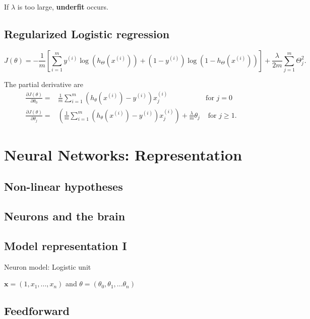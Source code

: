 \documentclass[a4paper,titlepage] {scrartcl}
\begin{document}
If $\lambda$ is too large, \textbf{underfit} occurs.

\subsection{Regularized Logistic regression} %
\label{sub:regularized_logistic_regression}
\begin{equation}
 J(\theta) = -\frac{1}{m}
				\left[
				 \sum_{i=1}^m 
					y^{(i)}\log{(h_\Theta(x^{(i)}))} 
					+
					(1-y^{(i)})\log{(1-h_\Theta(x^{(i)}))} 
				\right]
				+\frac{\lambda}{2m}\sum_{j=1}^m\Theta_j^2.
\end{equation}

The partial derivative are
\begin{eqnarray}
	\frac{\partial J(\theta)}{\partial \theta_0} =& \frac{1}{m}\sum_{i=1}^m(h_\theta(x^{(i)}) - y^{(i)})x_j^{(i)} 
	& \text{for }j=0\\
	\frac{\partial J(\theta)}{\partial \theta_j} =& \left(\frac{1}{m}\sum_{i=1}^m(h_\theta(x^{(i)}) - y^{(i)})x_j^{(i)}\right) + \frac{\lambda}{m}\theta_j 
	& \text{ for }j\geq1.
\end{eqnarray}



\section{Neural Networks: Representation} %
\label{sec:neural_networks}

\subsection{Non-linear hypotheses}

\subsection{Neurons and the brain}

\subsection{Model representation I}

Neuron model: Logistic unit

$\mathbf{x}=(1,x_1,...,x_n)$ and $\theta=(\theta_0, \theta_1, ...\theta_n)$

\subsection{Feedforward} %
\label{sub:feedforward}
\end{document}
